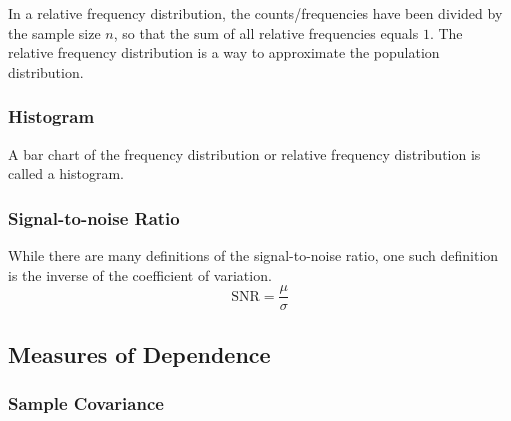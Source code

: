 \documentclass[11pt]{report} %
\begin{document}
In a relative frequency distribution, the counts/frequencies have been divided by the sample size $n$, so that the sum of all relative frequencies equals $1$. The relative frequency distribution is a way to approximate the population distribution.

\subsubsection{Histogram}

A bar chart of the frequency distribution or relative frequency distribution is called a histogram.

\subsubsection{Signal-to-noise Ratio}

While there are many definitions of the signal-to-noise ratio, one such definition is the inverse of the coefficient of variation.
\begin{equation}
\mathrm{SNR} = \dfrac{\mu}{\sigma}
\end{equation}

\subsection{Measures of Dependence}

\subsubsection{Sample Covariance}
\end{document}
